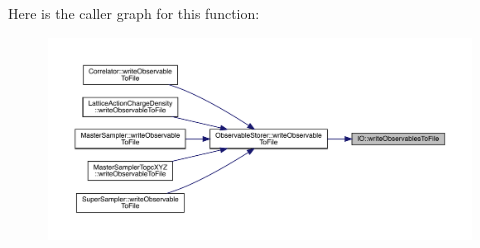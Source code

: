 Here is the caller graph for this function\+:\nopagebreak
\begin{figure}[H]
\begin{center}
\leavevmode
\includegraphics[width=350pt]{namespace_i_o_ad8cf5aef8f60d10b80292b69a091d5ac_icgraph}
\end{center}
\end{figure}
